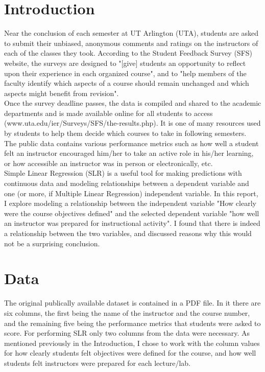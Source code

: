 \documentclass[10pt]{report}
\begin{document}
\section*{Introduction}
Near the conclusion of each semester at UT Arlington (UTA), students are asked to submit their unbiased, anonymous comments
and ratings on the instructors of each of the classes they took. According to the Student Feedback Survey (SFS) website, 
the surveys are designed to "[give] students an opportunity to reflect upon their experience in each organized course", and
to "help members of the faculty identify which aspects of a course should remain unchanged and which aspects might benefit
from revision". \\ 
Once the survey deadline passes, the data is compiled and shared to the academic departments and is made available online
for all students to access (www.uta.edu/ier/Surveys/SFS/the-results.php). It is one of many resources used by students to help them decide which
courses to take in following semesters.  \\
The public data contains various performance metrics such as how well a student felt an instructor encouraged
him/her to take an active role in his/her learning, or how accessible an instructor was in person or electronically, etc. \\
Simple Linear Regression (SLR) is a useful tool for making predictions with continuous data and modeling relationships between
a dependent variable and one (or more, if Multiple Linear Regression) independent variable.
In this report, I explore modeling a relationship between the independent variable "How clearly were the course objectives defined"
and the selected dependent variable "how well an instructor was prepared for instructional activity". I found that there is
indeed a relationship between the two variables, and discussed reasons why this would not be a surprising conclusion.

\newpage

\section*{Data}
The original publically available dataset is contained in a PDF file. In it there are six columns, the first being the 
name of the instructor and the course number, and the remaining five being the performance metrics that students were asked
to score. For performing SLR only two columns from the data were necessary. As mentioned previously in the Introduction,
I chose to work with the column values for how clearly students felt objectives were defined for the course, and how 
well students felt instructors were prepared for each lecture/lab. \\ 
\end{document}
